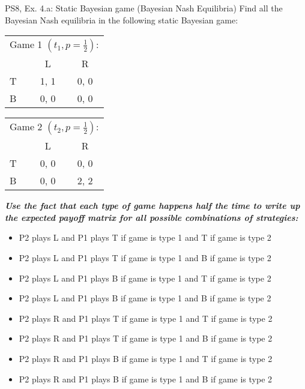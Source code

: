 \begin{frame}{PS8, Ex. 4.a: Static Bayesian game (Bayesian Nash Equilibria)}
    Find all the Bayesian Nash equilibria in the following static Bayesian game:
    \begin{table}
      \begin{tabular}{l|c|c|}
        \multicolumn{3}{c}{Game 1 $\left(t_1, p=\frac{1}{2}\right)$:}
        \\
        \multicolumn{1}{c}{} & \multicolumn{1}{c}{L} & \multicolumn{1}{c}{R} \\\cline{2-3}
        T & 1, 1 & 0, 0 \\\cline{2-3}
        B & 0, 0 & 0, 0 \\\cline{2-3}
      \end{tabular}
      \begin{tabular}{l|c|c|}
        \multicolumn{3}{c}{Game 2 $\left(t_2, p=\frac{1}{2}\right)$:}
        \\
        \multicolumn{1}{c}{} & \multicolumn{1}{c}{L} & \multicolumn{1}{c}{R} \\\cline{2-3}
        T & 0, 0 & 0, 0 \\\cline{2-3}
        B & 0, 0 & 2, 2 \\\cline{2-3}
      \end{tabular}
    \end{table}
    \textit{\textbf{Use the fact that each type of game happens half the time to write up the expected payoff matrix for all possible combinations of strategies:}}
    \begin{itemize}
        \item P2 plays L and P1 plays T if game is type 1 and T if game is type 2
        \item P2 plays L and P1 plays T if game is type 1 and B if game is type 2
        \item P2 plays L and P1 plays B if game is type 1 and T if game is type 2
        \item P2 plays L and P1 plays B if game is type 1 and B if game is type 2
        \item P2 plays R and P1 plays T if game is type 1 and T if game is type 2
        \item P2 plays R and P1 plays T if game is type 1 and B if game is type 2
        \item P2 plays R and P1 plays B if game is type 1 and T if game is type 2
        \item P2 plays R and P1 plays B if game is type 1 and B if game is type 2
    \end{itemize}
    \vfill\null\null
\end{frame}
